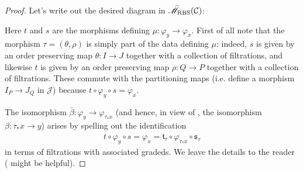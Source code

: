 \documentclass[12pt, reqno]{amsart}
\theoremstyle{plain}
\theoremstyle{definition}
\renewcommand{\phi}{\varphi}
\begin{document}
\begin{proof}
Let's write out the desired diagram in $\accentset{\sim}{\mathscr{M}}_{\operatorname{RBS}}(\mathcal{C})$:
\begin{center}
\end{center}

Here $t$ and $s$ are the morphisms defining $\mu\colon \phi_y\rightarrow \phi_x$. First of all note that the morphism $\tau=(\theta,\rho)$ is simply part of the data defining $\mu$: indeed, $s$ is given by an order preserving map $\theta\colon I\rightarrow J$ together with a collection of filtrations, and likewise $t$ is given by an order preserving map $\rho\colon Q\rightarrow P$ together with a collection of filtrations. These commute with the partitioning maps (i.e. define a morphism $I_P\rightarrow J_Q$ in $\mathcal{J}$) because $t\circ \phi_y\circ s = \phi_x$.

The isomorphism $\bar{\beta}\colon \phi_y\rightarrow \phi_{\tau_*x}$ (and hence, in view of , the isomorphism $\beta\colon\tau_*x\rightarrow y$) arises by spelling out the identification
\begin{align*}
t\circ \phi_y\circ s = \phi_x = \mathfrak{t}_\tau \circ \phi_{\tau_*x}\circ \mathfrak{s}_\tau
\end{align*}
in terms of filtrations with associated gradeds. We leave the details to the reader ( might be helpful).
\end{proof}
\end{document}
